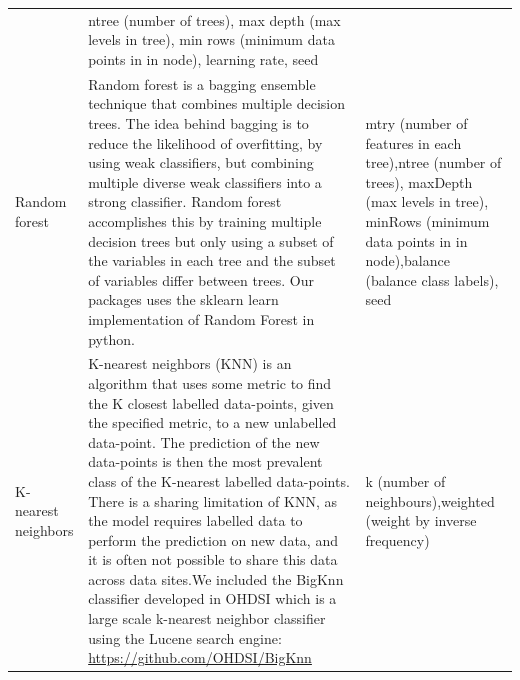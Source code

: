 \documentclass[]{article}
\begin{document}
\begin{longtable}[]{@{}lll@{}}
\begin{minipage}[t]{0.55\columnwidth}
\end{minipage} & \begin{minipage}[t]{0.25\columnwidth}\raggedright\strut
ntree (number of trees), max depth (max levels in tree), min rows
(minimum data points in in node), learning rate, seed\strut
\end{minipage}\tabularnewline
\begin{minipage}[t]{0.12\columnwidth}\raggedright\strut
Random forest\strut
\end{minipage} & \begin{minipage}[t]{0.55\columnwidth}\raggedright\strut
Random forest is a bagging ensemble technique that combines multiple
decision trees. The idea behind bagging is to reduce the likelihood of
overfitting, by using weak classifiers, but combining multiple diverse
weak classifiers into a strong classifier. Random forest accomplishes
this by training multiple decision trees but only using a subset of the
variables in each tree and the subset of variables differ between trees.
Our packages uses the sklearn learn implementation of Random Forest in
python.\strut
\end{minipage} & \begin{minipage}[t]{0.25\columnwidth}\raggedright\strut
mtry (number of features in each tree),ntree (number of trees), maxDepth
(max levels in tree), minRows (minimum data points in in node),balance
(balance class labels), seed\strut
\end{minipage}\tabularnewline
\begin{minipage}[t]{0.12\columnwidth}\raggedright\strut
K-nearest neighbors\strut
\end{minipage} & \begin{minipage}[t]{0.55\columnwidth}\raggedright\strut
K-nearest neighbors (KNN) is an algorithm that uses some metric to find
the K closest labelled data-points, given the specified metric, to a new
unlabelled data-point. The prediction of the new data-points is then the
most prevalent class of the K-nearest labelled data-points. There is a
sharing limitation of KNN, as the model requires labelled data to
perform the prediction on new data, and it is often not possible to
share this data across data sites.We included the BigKnn classifier
developed in OHDSI which is a large scale k-nearest neighbor classifier
using the Lucene search engine:
\url{https://github.com/OHDSI/BigKnn}\strut
\end{minipage} & \begin{minipage}[t]{0.25\columnwidth}\raggedright\strut
k (number of neighbours),weighted (weight by inverse frequency)\strut

\end{minipage}
\end{longtable}
\end{document}
